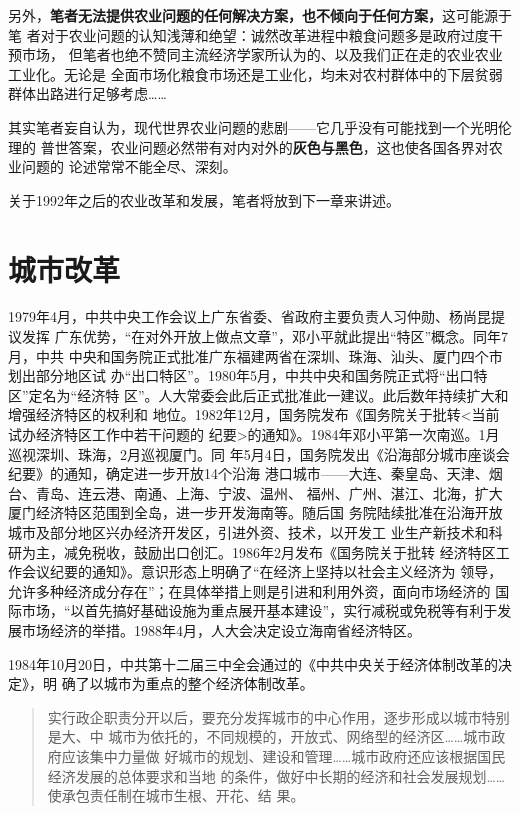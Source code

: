 另外，\textbf{笔者无法提供农业问题的任何解决方案，也不倾向于任何方案，}这可能源于笔
者对于农业问题的认知浅薄和绝望：诚然改革进程中粮食问题多是政府过度干预市场，
但笔者也绝不赞同主流经济学家所认为的、以及我们正在走的农业农业工业化。无论是
全面市场化粮食市场还是工业化，均未对农村群体中的下层贫弱群体出路进行足够考虑……

其实笔者妄自认为，现代世界农业问题的悲剧——它几乎没有可能找到一个光明伦理的
普世答案，农业问题必然带有对内对外的\textbf{灰色与黑色}，这也使各国各界对农业问题的
论述常常不能全尽、深刻。


关于1992年之后的农业改革和发展，笔者将放到下一章来讲述。




\section{城市改革}

1979年4月，中共中央工作会议上广东省委、省政府主要负责人习仲勋、杨尚昆提议发挥
广东优势，“在对外开放上做点文章”，邓小平就此提出“特区”概念。同年7月，中共
中央和国务院正式批准广东福建两省在深圳、珠海、汕头、厦门四个市划出部分地区试
办“出口特区”。1980年5月，中共中央和国务院正式将“出口特区”定名为“经济特
区”。人大常委会此后正式批准此一建议。此后数年持续扩大和增强经济特区的权利和
地位。1982年12月，国务院发布《国务院关于批转<当前试办经济特区工作中若干问题的
纪要>的通知》。1984年邓小平第一次南巡。1月巡视深圳、珠海，2月巡视厦门。同
年5月4日，国务院发出《沿海部分城市座谈会纪要》的通知，确定进一步开放14个沿海
港口城市——大连、秦皇岛、天津、烟台、青岛、连云港、南通、上海、宁波、温州、
福州、广州、湛江、北海，扩大厦门经济特区范围到全岛，进一步开发海南等。随后国
务院陆续批准在沿海开放城市及部分地区兴办经济开发区，引进外资、技术，以开发工
业生产新技术和科研为主，减免税收，鼓励出口创汇。1986年2月发布《国务院关于批转
经济特区工作会议纪要的通知》。意识形态上明确了“在经济上坚持以社会主义经济为
领导，允许多种经济成分存在”；在具体举措上则是引进和利用外资，面向市场经济的
国际市场，“以首先搞好基础设施为重点展开基本建设”，实行减税或免税等有利于发
展市场经济的举措。1988年4月，人大会决定设立海南省经济特区。

1984年10月20日，中共第十二届三中全会通过的《中共中央关于经济体制改革的决定》，明
确了以城市为重点的整个经济体制改革。
\begin{quotation}
  实行政企职责分开以后，要充分发挥城市的中心作用，逐步形成以城市特别是大、中
  城市为依托的，不同规模的，开放式、网络型的经济区……城市政府应该集中力量做
  好城市的规划、建设和管理……城市政府还应该根据国民经济发展的总体要求和当地
  的条件，做好中长期的经济和社会发展规划……使承包责任制在城市生根、开花、结
  果。
\end{quotation}

